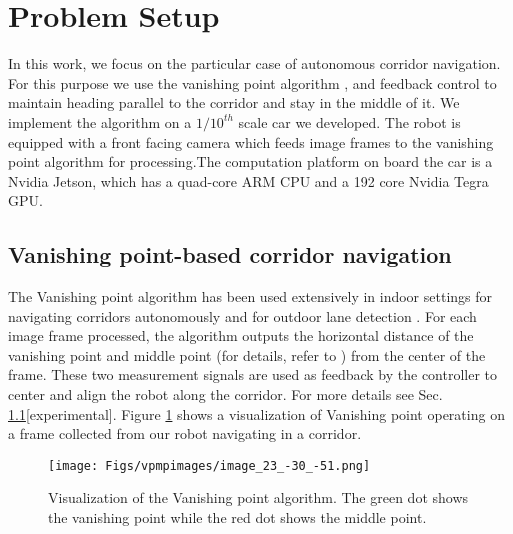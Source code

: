 \section{Problem Setup}

In this work, we focus on the particular case of autonomous corridor navigation. For this purpose we use the vanishing point algorithm \cite{VP1}, \cite{VP2} and feedback control to maintain heading parallel to the corridor and stay in the middle of it. We implement the algorithm on a $1/10^{th}$ scale car we developed. The robot is equipped with a front facing camera which feeds image frames to the vanishing point algorithm for processing.The computation platform on board the car is a Nvidia Jetson, which has a quad-core ARM CPU and a 192 core Nvidia Tegra GPU.


\subsection{Vanishing point-based corridor navigation}

The Vanishing point algorithm \cite{VP1} has been used extensively in indoor settings for navigating corridors autonomously \cite{VP2, VP3} and for outdoor lane detection \cite{gallagher2002ground}.
For each image frame processed, the algorithm outputs the horizontal distance of the vanishing point and middle point (for details, refer to \cite{VP1}) from the center of the frame. These two measurement signals are used as feedback by the controller to center and align the robot along the corridor. For more details see Sec. \ref{}[experimental]. Figure \ref{fig:vp_viz} shows a visualization of Vanishing point operating on a frame collected from our robot navigating in a corridor.

\begin{figure}[hbtp]
\centering
\texttt{[image: Figs/vpmpimages/image\_23\_-30\_-51.png]}
\caption{Visualization of the Vanishing point algorithm. The green dot shows the vanishing point while the red dot shows the middle point.}
\label{fig:vp_viz} %
\end{figure}

